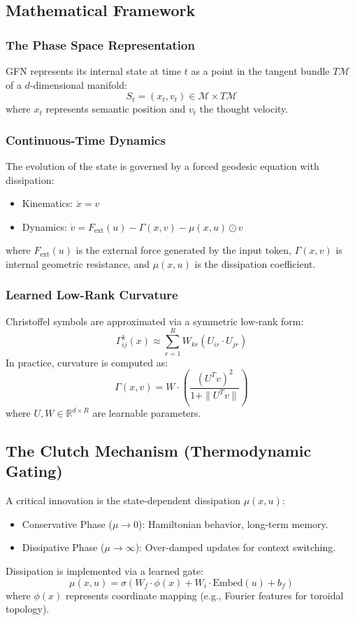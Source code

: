 \documentclass{article}
\numberwithin{equation}{section}
\begin{document}
\subsection{Mathematical Framework}
\subsubsection{The Phase Space Representation}
GFN represents its internal state at time $t$ as a point in the tangent bundle $T\mathcal{M}$ of a $d$-dimensional manifold:
\[
S_t = (x_t, v_t) \in \mathcal{M} \times T\mathcal{M}
\]
where $x_t$ represents semantic position and $v_t$ the thought velocity.

\subsubsection{Continuous-Time Dynamics}
The evolution of the state is governed by a forced geodesic equation with dissipation:
\begin{itemize}
\item Kinematics: $\dot{x} = v$
\item Dynamics: $\dot{v} = F_{\text{ext}}(u) - \Gamma(x, v) - \mu(x, u) \odot v$
\end{itemize}
where $F_{\text{ext}}(u)$ is the external force generated by the input token, $\Gamma(x, v)$ is internal geometric resistance, and $\mu(x, u)$ is the dissipation coefficient.

\subsubsection{Learned Low-Rank Curvature}
Christoffel symbols are approximated via a symmetric low-rank form:
\[
\Gamma^k_{ij}(x) \approx \sum_{r=1}^R W_{kr} (U_{ir} \cdot U_{jr})
\]
In practice, curvature is computed as:
\[
\Gamma(x, v) = W \cdot \left( \frac{(U^T v)^2}{1 + \|U^T v\|} \right)
\]
where $U, W \in \mathbb{R}^{d \times R}$ are learnable parameters.

\subsection{The Clutch Mechanism (Thermodynamic Gating)}
A critical innovation is the state-dependent dissipation $\mu(x, u)$:
\begin{itemize}
\item Conservative Phase ($\mu \to 0$): Hamiltonian behavior, long-term memory.
\item Dissipative Phase ($\mu \to \infty$): Over-damped updates for context switching.
\end{itemize}
Dissipation is implemented via a learned gate:
\[
\mu(x, u) = \sigma(W_f \cdot \phi(x) + W_i \cdot \text{Embed}(u) + b_f)
\]
where $\phi(x)$ represents coordinate mapping (e.g., Fourier features for toroidal topology).
\end{document}
